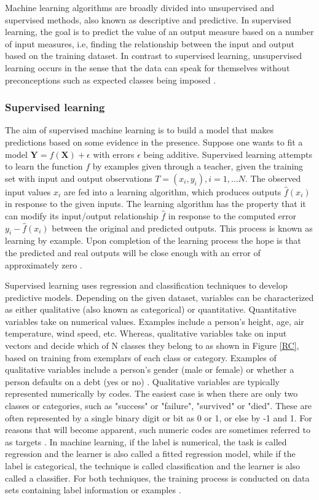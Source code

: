 Machine learning algorithms are broadly divided into unsupervised and supervised methods, also known as descriptive and predictive. In supervised learning, the goal is to predict the value of an output measure based on a number of input measures, i.e, finding the relationship between the input and output based on the training dataset. In contrast to supervised learning, unsupervised learning occurs in the sense that the data can speak for themselves
without preconceptions such as expected classes being imposed \citep{ball2010data}. 

\subsubsection{Supervised learning}
The aim of supervised machine learning is to build a model
that makes predictions based on some evidence in the presence. Suppose  one wants to fit a model $\textbf{Y}=f(\textbf{X})+\epsilon$ with errors $\epsilon$ being additive. Supervised learning attempts to learn the function $f$ by examples given through a teacher, given the training set with input and output observations $T=(x_i,y_i ), i=1,\dots N$. The observed input values $x_i$ are fed into a learning algorithm, which produces outputs $\widehat{f}(x_i)$ in response to the given inputs. The learning algorithm has the property that it can modify its input/output relationship $\widehat{f}$ in response to the computed error $y_i- \widehat{f} (x_i)$ between the original and predicted outputs. This process is known as learning by example. Upon completion of the learning process the hope is that the predicted and real outputs will be close enough with an error of approximately zero \citep{friedman2001elements}.

Supervised learning uses regression and classification techniques
to develop predictive models. Depending on the given dataset, variables can be characterized as either qualitative (also known as categorical) or quantitative. Quantitative variables take on numerical values. Examples include a person's height, age, air temperature, wind speed, etc. Whereas, qualitative variables take on input vectors and decide which of N classes
they belong to as shown in Figure \ref{RC}, based on training from exemplars of each class or category. Examples of qualitative variables include a person’s gender (male or female) or whether a person defaults on a debt (yes or no) \citep{aitkin2009statistical}. Qualitative variables are typically represented numerically by codes. The easiest case is when there are only two classes or categories, such as "success"
or "failure", "survived" or "died". These are often represented by a single binary digit or bit as 0 or 1, or else by -1 and 1. For reasons that will become apparent, such numeric codes are sometimes referred to as targets \citep{friedman2001elements}. In machine learning, if the label is numerical, the task is called regression and the learner is also called a fitted regression model, while if the label is categorical, the technique is called classification and the learner is also called a classifier. For both techniques, the training process is conducted on data sets containing label information or examples \citep{zhou2012ensemble}.

